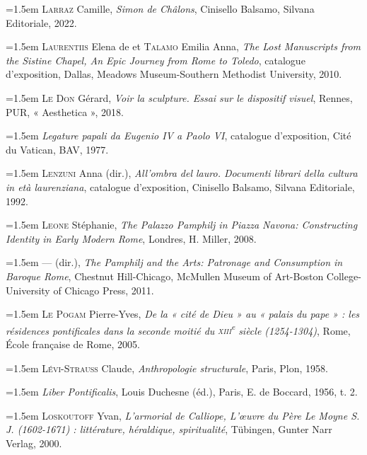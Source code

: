 \documentclass[12pt,twoside,openany]{book}
\newenvironment{PurhBibliography}
  {%
    \par
    \setlength{\parindent}{0pt}%
    \setlength{\leftskip}{0pt}%
  }
  {%
    \par
  }
\begin{document}
\begin{PurhBibliography}
\noindent\hangindent=1.5em \textsc{Larraz} Camille, \textit{Simon de Châlons}, Cinisello Balsamo, Silvana Editoriale, 2022.\par
\noindent\hangindent=1.5em \textsc{Laurentiis} Elena de et \textsc{Talamo} Emilia Anna, \textit{The Lost Manuscripts from the Sistine Chapel, An Epic Journey from Rome to Toledo}, catalogue d’exposition, Dallas, Meadows Museum-Southern Methodist University, 2010.\par
\noindent\hangindent=1.5em \textsc{Le Don} Gérard, \textit{Voir la sculpture. Essai sur le dispositif visuel}, Rennes, \textsc{PUR}, « Aesthetica », 2018.\par
\noindent\hangindent=1.5em \textit{Legature papali da Eugenio IV a Paolo VI}, catalogue d’exposition, Cité du Vatican, BAV, 1977.\par
\noindent\hangindent=1.5em \textsc{Lenzuni} Anna (dir.), \textit{All’ombra del lauro. Documenti librari della cultura in età laurenziana}, catalogue d’exposition, Cinisello Balsamo, Silvana Editoriale, 1992.\par
\noindent\hangindent=1.5em \textsc{Leone} Stéphanie, \textit{The Palazzo Pamphilj in Piazza Navona: Constructing Identity in Early Modern Rome}, Londres, H. Miller, 2008.\par
\noindent\hangindent=1.5em \textsc{—} (dir.),\textit{ The Pamphilj and the Arts: Patronage and Consumption in Baroque Rome}, Chestnut Hill-Chicago, McMullen Museum of Art-Boston College-University of Chicago Press, 2011.\par
\noindent\hangindent=1.5em \textsc{Le Pogam} Pierre-Yves, \textit{De la « cité de Dieu » au « palais du pape » : les résidences pontificales dans la seconde moitié du }\textit{\textsc{xiii}}\textit{\textsuperscript{e}}\textit{ siècle (1254-1304)}, Rome, École française de Rome, 2005.\par
\noindent\hangindent=1.5em \textsc{Lévi}-\textsc{Strauss} Claude, \textit{Anthropologie structurale}, Paris, Plon, 1958.\par
\noindent\hangindent=1.5em \textit{Liber Pontificalis}, Louis Duchesne (éd.), Paris, E. de Boccard, 1956, t. 2.\par
\noindent\hangindent=1.5em \textsc{Loskoutoff} Yvan, \textit{L’armorial de Calliope, L’œuvre du Père Le Moyne S. J. (1602-1671) : littérature, héraldique, spiritualité}, Tübingen, Gunter Narr Verlag, 2000.\par

\end{PurhBibliography}
\end{document}
